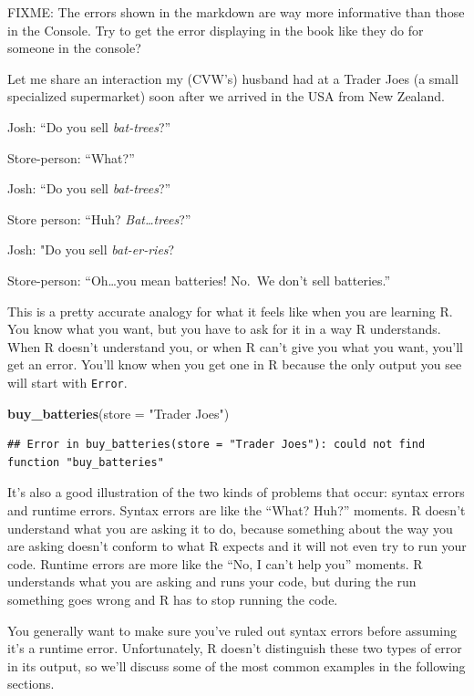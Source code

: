 \documentclass[]{Nemilov}
\newenvironment{Shaded}{\begin{snugshade}}{\end{snugshade}}
\newcommand{\DataTypeTok}[1]{\textcolor[rgb]{0.13,0.29,0.53}{#1}}
\newcommand{\KeywordTok}[1]{\textcolor[rgb]{0.13,0.29,0.53}{\textbf{#1}}}
\newcommand{\NormalTok}[1]{#1}
\newcommand{\StringTok}[1]{\textcolor[rgb]{0.31,0.60,0.02}{#1}}
\begin{document}
FIXME: The errors shown in the markdown are way more informative than those in the Console. Try to get the error displaying in the book like they do for someone in the console?

Let me share an interaction my (CVW's) husband had at a Trader Joes (a small specialized supermarket) soon after we arrived in the USA from New Zealand.

Josh: ``Do you sell \emph{bat-trees}?''

Store-person: ``What?''

Josh: ``Do you sell \emph{bat-trees}?''

Store person: ``Huh? \emph{Bat\ldots{}trees}?''

Josh: "Do you sell \emph{bat-er-ries}?

Store-person: ``Oh\ldots{}you mean batteries! No.~We don't sell batteries.''

This is a pretty accurate analogy for what it feels like when you are learning R. You know what you want, but you have to ask for it in a way R understands. When R doesn't understand you, or when R can't give you what you want, you'll get an error. You'll know when you get one in R because the only output you see will start with \texttt{Error}.

\begin{Shaded}
\begin{Highlighting}[]
\KeywordTok{buy_batteries}\NormalTok{(}\DataTypeTok{store =} \StringTok{"Trader Joes"}\NormalTok{)}
\end{Highlighting}
\end{Shaded}

\begin{verbatim}
## Error in buy_batteries(store = "Trader Joes"): could not find function "buy_batteries"
\end{verbatim}

It's also a good illustration of the two kinds of problems that occur: syntax errors and runtime errors. Syntax errors are like the ``What? Huh?'' moments. R doesn't understand what you are asking it to do, because something about the way you are asking doesn't conform to what R expects and it will not even try to run your code. Runtime errors are more like the ``No, I can't help you'' moments. R understands what you are asking and runs your code, but during the run something goes wrong and R has to stop running the code.

You generally want to make sure you've ruled out syntax errors before assuming it's a runtime error. Unfortunately, R doesn't distinguish these two types of error in its output, so we'll discuss some of the most common examples in the following sections.
\end{document}
